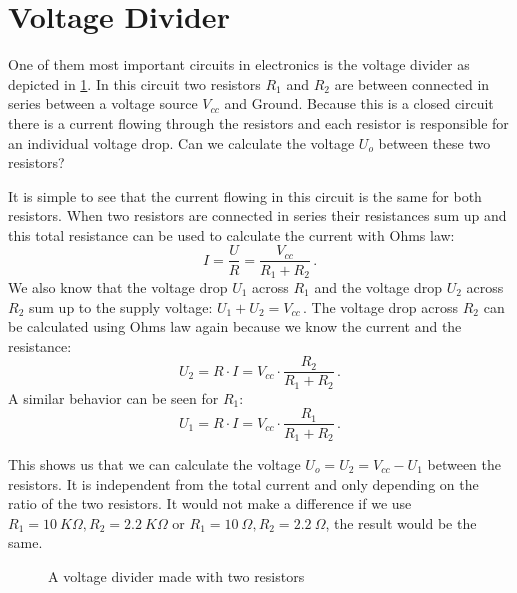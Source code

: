 \section{Voltage Divider}

One of them most important circuits in electronics is the voltage divider as depicted in \cref{fig:simple-voltage-divider}. In this circuit two resistors $R_1$ and $R_2$ are between connected in series between a voltage source $V_{cc}$ and Ground. Because this is a closed circuit there is a current flowing through the resistors and each resistor is responsible for an individual voltage drop. Can we calculate the voltage $U_o$ between these two resistors?

It is simple to see that the current flowing in this circuit is the same for both resistors. When two resistors are connected in series their resistances sum up and this total resistance can be used to calculate the current with Ohms law:
\begin{equation*}
	I = \frac{U}{R} = \frac{V_{cc}}{R_1 + R_2}\,.
\end{equation*}
We also know that the voltage drop $U_1$ across $R_1$ and the voltage drop $U_2$ across $R_2$ sum up to the supply voltage: $U_1 + U_2 = V_{cc}\,$. The voltage drop across $R_2$ can be calculated using Ohms law again because we know the current and the resistance:
\begin{equation*}
	U_2 = R \cdot I = V_{cc} \cdot \frac{R_2}{R_1 + R_2}\,.
\end{equation*}
A similar behavior can be seen for $R_1$:
\begin{equation*}
	U_1 = R \cdot I = V_{cc} \cdot \frac{R_1}{R_1 + R_2}\,.
\end{equation*}

This shows us that we can calculate the voltage $U_o = U_2 = V_{cc} - U_1$ between the resistors. It is independent from the total current and only depending on the ratio of the two resistors. It would not make a difference if we use $R_1 = \SI{10}{K\Omega}, R_2 = \SI{2,2}{K\Omega}$ or $R_1 = \SI{10}{\Omega}, R_2 = \SI{2,2}{\Omega}$, the result would be the same.


\begin{figure}[htb]
	\centering
	\caption{A voltage divider made with two resistors}
	\label{fig:simple-voltage-divider}
\end{figure}


